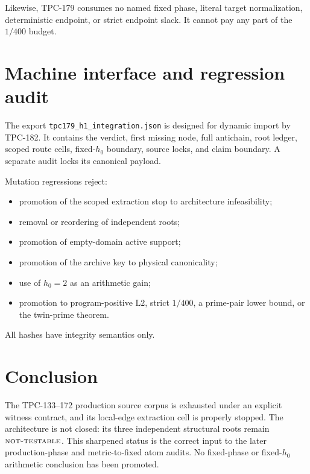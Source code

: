 \documentclass[11pt]{article}
\theoremstyle{definition}
\theoremstyle{remark}
\newcommand{\Ltwo}{\mathrm{L2}}
\newcommand{\NT}{\textnormal{\textsc{not-testable}}}
\begin{document}
Likewise, TPC-179 consumes no named fixed phase, literal target
normalization, deterministic endpoint, or strict endpoint slack.
It cannot pay any part of the \(1/400\) budget.

\section{Machine interface and regression audit}

The export \texttt{tpc179\_h1\_integration.json} is designed for
dynamic import by TPC-182.  It contains the verdict, first missing
node, full antichain, root ledger, scoped route cells, fixed-\(h_0\)
boundary, source locks, and claim boundary.  A separate audit locks
its canonical payload.

Mutation regressions reject:

\begin{itemize}[leftmargin=*]
\item promotion of the scoped extraction stop to architecture
      infeasibility;
\item removal or reordering of independent roots;
\item promotion of empty-domain active support;
\item promotion of the archive key to physical canonicality;
\item use of \(h_0=2\) as an arithmetic gain;
\item promotion to program-positive \(\Ltwo\), strict \(1/400\),
      a prime-pair lower bound, or the twin-prime theorem.
\end{itemize}

All hashes have integrity semantics only.

\section{Conclusion}

The TPC-133--172 production source corpus is exhausted under an
explicit witness contract, and its local-edge extraction cell is
properly stopped.  The architecture is not closed: its three
independent structural roots remain \(\NT\).  This sharpened status
is the correct input to the later production-phase and metric-to-fixed
atom audits.  No fixed-phase or fixed-\(h_0\) arithmetic conclusion
has been promoted.

\nocite{*}


\end{document}
